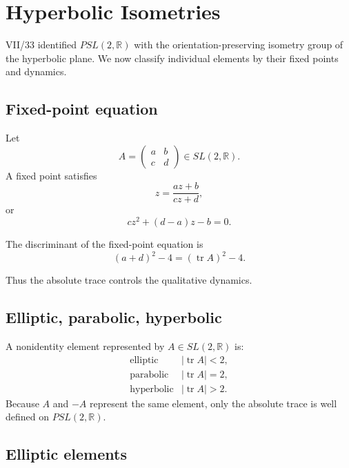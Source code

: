 \chapter{Hyperbolic Isometries}
\label{ch:vii34-hyperbolic-isometries}

VII/33 identified \(PSL(2,\mathbb R)\) with the orientation-preserving isometry
group of the hyperbolic plane.  We now classify individual elements by their
fixed points and dynamics.

\section{Fixed-point equation}

Let
\[
A=
\begin{pmatrix}
a&b\\c&d
\end{pmatrix}
\in SL(2,\mathbb R).
\]
A fixed point satisfies
\[
z=\frac{az+b}{cz+d},
\]
or
\[
cz^2+(d-a)z-b=0.
\]

\begin{proposition}[Discriminant]\label{prop:vii34-discriminant}
The discriminant of the fixed-point equation is
\[
(a+d)^2-4
=
(\operatorname{tr}A)^2-4.
\]
\end{proposition}

Thus the absolute trace controls the qualitative dynamics.

\section{Elliptic, parabolic, hyperbolic}

\begin{definition}[Classification]\label{def:vii34-classification}
A nonidentity element represented by \(A\in SL(2,\mathbb R)\) is:
\[
\begin{array}{ll}
\text{elliptic} & |\operatorname{tr}A|<2,\\
\text{parabolic} & |\operatorname{tr}A|=2,\\
\text{hyperbolic} & |\operatorname{tr}A|>2.
\end{array}
\]
Because \(A\) and \(-A\) represent the same element, only the absolute trace is
well defined on \(PSL(2,\mathbb R)\).
\end{definition}

\section{Elliptic elements}

